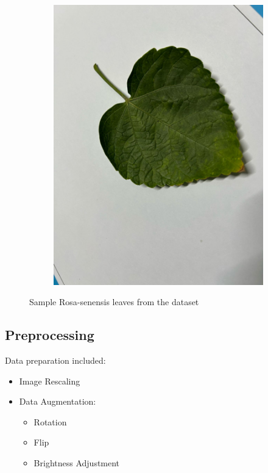 \documentclass[twocolumn]{article}
\begin{document}
\begin{figure}[H]
\begin{subfigure}[b]{0.30\columnwidth}
        \includegraphics[width=\textwidth]{rosa9}
    \end{subfigure}
    \caption{Sample Rosa-senensis leaves from the dataset}
    \label{fig:rosa-samples}
\end{figure}

\subsection{Preprocessing}
Data preparation included:
\begin{itemize}\itemsep4pt
    \item Image Rescaling
    \item Data Augmentation:
    \begin{itemize}\itemsep2pt
        \item Rotation
        \item Flip
        \item Brightness Adjustment
    \end{itemize}
\end{itemize}
\end{document}
